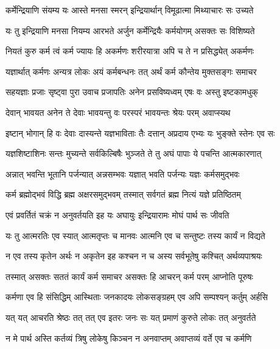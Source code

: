 \twolineshloka
{कर्मेन्द्रियाणि संयम्य यः आस्ते मनसा स्मरन्}
{इन्द्रियार्थान् विमूढात्मा मिथ्याचारः सः उच्यते}%

\twolineshloka
{यः तु इन्द्रियाणि मनसा नियम्य आरभते अर्जुन}
{कर्मेन्द्रियैः कर्मयोगम् असक्तः सः विशिष्यते}%

\twolineshloka
{नियतं कुरु कर्म त्वं कर्म ज्यायः हि अकर्मणः}
{शरीरयात्रा अपि च ते न प्रसिद्ध्येत् अकर्मणः}%

\twolineshloka
{यज्ञार्थात् कर्मणः अन्यत्र लोकः अयं कर्मबन्धनः}
{तत् अर्थं कर्म कौन्तेय मुक्तसङ्गः समाचर}%

\twolineshloka
{सहयज्ञाः प्रजाः सृष्ट्वा पुरा उवाच प्रजापतिः}
{अनेन प्रसविष्यध्वम् एषः वः अस्तु इष्टकामधुक्}%

\twolineshloka
{देवान् भावयत अनेन ते देवाः भावयन्तु वः}
{परस्परं भावयन्तः श्रेयः परम् अवाप्स्यथ}%

\twolineshloka
{इष्टान् भोगान् हि वः देवाः दास्यन्ते यज्ञभाविताः}
{तैः दत्तान् अप्रदाय एभ्यः यः भुङ्क्ते स्तेनः एव सः}%

\twolineshloka
{यज्ञशिष्टाशिनः सन्तः मुच्यन्ते सर्वकिल्बिषैः}
{भुञ्जते ते तु अघं पापाः ये पचन्ति आत्मकारणात्}%

\twolineshloka
{अन्नात् भवन्ति भूतानि पर्जन्यात् अन्नसम्भवः}
{यज्ञात् भवति पर्जन्यः यज्ञः कर्मसमुद्भवः}%

\twolineshloka
{कर्म ब्रह्मोद्भवं विद्धि ब्रह्म अक्षरसमुद्भवम्}
{तस्मात् सर्वगतं ब्रह्म नित्यं यज्ञे प्रतिष्ठितम्}%

\twolineshloka
{एवं प्रवर्तितं चक्रं न अनुवर्तयति इह यः}
{अघायुः इन्द्रियारामः मोघं पार्थ सः जीवति}%

\twolineshloka
{यः तु आत्मरतिः एव स्यात् आत्मतृप्तः च मानवः}
{आत्मनि एव च सन्तुष्टः तस्य कार्यं न विद्यते}%

\twolineshloka
{न एव तस्य कृतेन अर्थः न अकृतेन इह कश्चन}
{न च अस्य सर्वभूतेषु कश्चित् अर्थव्यपाश्रयः}%

\twolineshloka
{तस्मात् असक्तः सततं कार्यं कर्म समाचर}
{असक्तः हि आचरन् कर्म परम् आप्नोति पूरुषः}%

\twolineshloka
{कर्मणा एव हि संसिद्धिम् आस्थिताः जनकादयः}
{लोकसङ्ग्रहम् एव अपि सम्पश्यन् कर्तुम् अर्हसि}%

\twolineshloka
{यत् यत् आचरति श्रेष्ठः तत् तत् एव इतरः जनः}
{सः यत् प्रमाणं कुरुते लोकः तत् अनुवर्तते}%

\twolineshloka
{न मे पार्थ अस्ति कर्तव्यं त्रिषु लोकेषु किञ्चन}
{न अनवाप्तम् अवाप्तव्यं वर्ते एव च कर्मणि}%

